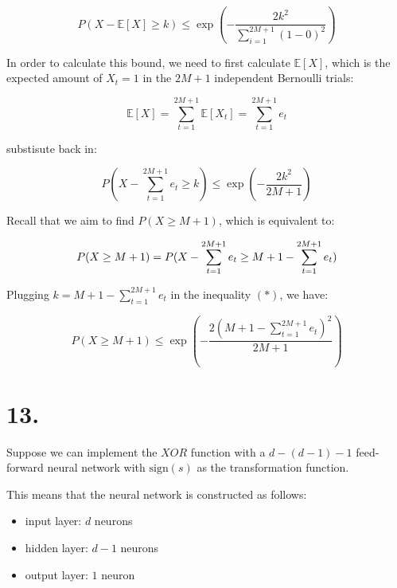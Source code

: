 \documentclass{article}
\begin{document}
\begin{equation*}
    P(X - \mathbb{E}[X] \ge k) \le \exp\left(-\frac{2k^2}{\sum_{i=1}^{2M+1}(1 - 0)^2}\right) 
\end{equation*}

In order to calculate this bound, we need to first calculate $\mathbb{E}[X]$, 
which is the expected amount of $X_t = 1$ in the $2M + 1$ independent Bernoulli trials:

\begin{equation*}
    \mathbb{E}[X] = \sum_{t=1}^{2M+1} \mathbb{E}[X_t] = \sum_{t=1}^{2M+1} e_t
\end{equation*}

substisute back in:

\begin{equation*}
    P(X - \sum_{t=1}^{2M+1} e_t \ge k) \le \exp\left(-\frac{2k^2}{2M + 1}\right) 
    \tag{*}
\end{equation*}

Recall that we aim to find $P(X \ge M+1)$, which is equivalent to:

\begin{equation*}
    P(X \ge M+1) = P(X - \sum_{t=1}^{2M+1} e_t \ge M + 1 - \sum_{t=1}^{2M+1} e_t) \\
\end{equation*}

Plugging $k = M + 1 - \sum_{t=1}^{2M+1} e_t$ in the inequality $(*)$, we have:

\begin{equation*}
    P(X \ge M + 1) \le \exp\left(-\frac{2(M + 1 - \sum_{t=1}^{2M+1} e_t)^2}{2M + 1}\right) 
\end{equation*}

\section*{13.}

Suppose we can implement the $XOR$ function with a $d - (d-1) - 1$ feed-forward neural network 
with $\mathrm{sign}(s)$ as the transformation function.
\bigskip

This means that the neural network is constructed as follows:

\begin{itemize}
    \item input layer: $d$ neurons
    \item hidden layer: $d-1$ neurons
    \item output layer: $1$ neuron
\end{itemize}
\end{document}

